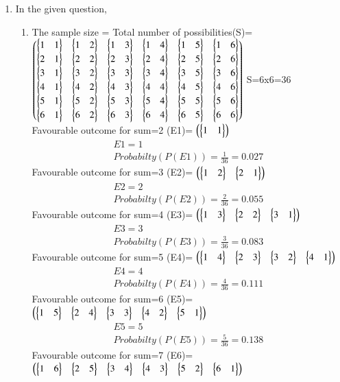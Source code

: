\renewcommand{\theequation}{\theenumi}
\begin{enumerate}[label=\arabic*.,ref=\thesubsubsection.\theenumi]
\item In the given question,
\\
\begin{enumerate}
\item
The sample size = Total number of possibilities(S)=
$\myvec{\bmat{1&1}&\bmat{1&2}&\bmat{1&3}&\bmat{1&4}&\bmat{1&5}&\bmat{1&6}\\
\bmat{2&1}&\bmat{2&2}&\bmat{2&3}&\bmat{2&4}&\bmat{2&5}&\bmat{2&6}
\\\bmat{3&1}&\bmat{3&2}&\bmat{3&3}&\bmat{3&4}&\bmat{3&5}&\bmat{3&6}
\\\bmat{4&1}&\bmat{4&2}&\bmat{4&3}&\bmat{4&4}&\bmat{4&5}&\bmat{4&6}
\\\bmat{5&1}&\bmat{5&2}&\bmat{5&3}&\bmat{5&4}&\bmat{5&5}&\bmat{5&6}
\\\bmat{6&1}&\bmat{6&2}&\bmat{6&3}&\bmat{6&4}&\bmat{6&5}&\bmat{6&6}}$
S=6x6=36
\\
Favourable outcome for sum=2 (E1)=
$\myvec{\bmat{1&1}}$
\begin{align}
E1=1
\\
Probabilty(P(E1))=\frac{1}{36}=0.027
\end{align}
Favourable outcome for sum=3 (E2)= 
$\myvec{\bmat{1&2}&\bmat{2&1}}$
\begin{align}
E2=2 
\\
Probabilty(P(E2))=\frac{2}{36}=0.055
\end{align}
Favourable outcome for sum=4 (E3)= 
$\myvec{\bmat{1&3}&\bmat{2&2}&\bmat{3&1}}$
\begin{align}
E3=3 
\\
Probabilty(P(E3))=\frac{3}{36}=0.083
\end{align}
Favourable outcome for sum=5 (E4)= 
$\myvec{\bmat{1&4}&\bmat{2&3}&\bmat{3&2}&\bmat{4&1}}$
\begin{align}
E4=4
\\
Probabilty(P(E4))=\frac{4}{36}=0.111
\end{align}
Favourable outcome for sum=6 (E5)= 
$\myvec{\bmat{1&5}&\bmat{2&4}&\bmat{3&3}&\bmat{4&2}&\bmat{5&1}}$
\begin{align}
E5=5
\\
Probabilty(P(E5))=\frac{5}{36}=0.138
\end{align}
Favourable outcome for sum=7 (E6)= 
$\myvec{\bmat{1&6}&\bmat{2&5}&\bmat{3&4}&\bmat{4&3}&\bmat{5&2}&\bmat{6&1}}$
\begin{align}

\end{align}
\end{enumerate}
\end{enumerate}
